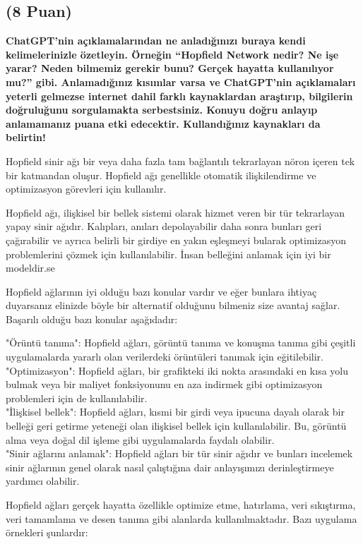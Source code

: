 \documentclass[11pt]{article}
\begin{document}
\subsection{(8 Puan)} \textbf{ChatGPT’nin açıklamalarından ne anladığınızı buraya kendi kelimelerinizle özetleyin. Örneğin ``Hopfield Network nedir? Ne işe yarar? Neden bilmemiz gerekir bunu? Gerçek hayatta kullanılıyor mu?'' gibi. Anlamadığınız kısımlar varsa ve ChatGPT’nin açıklamaları yeterli gelmezse internet dahil farklı kaynaklardan araştırıp, bilgilerin doğruluğunu sorgulamakta serbestsiniz. Konuyu doğru anlayıp anlamamanız puana etki edecektir. Kullandığınız kaynakları da belirtin!}

Hopfield sinir ağı bir veya daha fazla tam bağlantılı tekrarlayan nöron içeren tek bir katmandan oluşur. Hopfield ağı genellikle otomatik ilişkilendirme ve optimizasyon görevleri için kullanılır.

Hopfield ağı, ilişkisel bir bellek sistemi olarak hizmet veren bir tür tekrarlayan yapay sinir ağıdır. Kalıpları, anıları depolayabilir daha sonra bunları geri çağırabilir ve ayrıca belirli bir girdiye en yakın eşleşmeyi bularak optimizasyon problemlerini çözmek için kullanılabilir. İnsan belleğini anlamak için iyi bir modeldir.se

Hopfield ağlarının iyi olduğu bazı konular vardır ve eğer bunlara ihtiyaç duyarsanız elinizde böyle bir alternatif olduğunu bilmeniz size avantaj sağlar. Başarılı olduğu bazı konular aşağıdadır:

"Örüntü tanıma": Hopfield ağları, görüntü tanıma ve konuşma tanıma gibi çeşitli uygulamalarda yararlı olan verilerdeki örüntüleri tanımak için eğitilebilir.
\\"Optimizasyon": Hopfield ağları, bir grafikteki iki nokta arasındaki en kısa yolu bulmak veya bir maliyet fonksiyonunu en aza indirmek gibi optimizasyon problemleri için de kullanılabilir.
\\"İlişkisel bellek": Hopfield ağları, kısmi bir girdi veya ipucuna dayalı olarak bir belleği geri getirme yeteneği olan ilişkisel bellek için kullanılabilir. Bu, görüntü alma veya doğal dil işleme gibi uygulamalarda faydalı olabilir.
\\"Sinir ağlarını anlamak": Hopfield ağları bir tür sinir ağıdır ve bunları incelemek sinir ağlarının genel olarak nasıl çalıştığına dair anlayışımızı derinleştirmeye yardımcı olabilir.

Hopfield ağları gerçek hayatta özellikle optimize etme, hatırlama, veri sıkıştırma, veri tamamlama ve desen tanıma gibi alanlarda kullanılmaktadır. Bazı uygulama örnekleri şunlardır:
\end{document}
